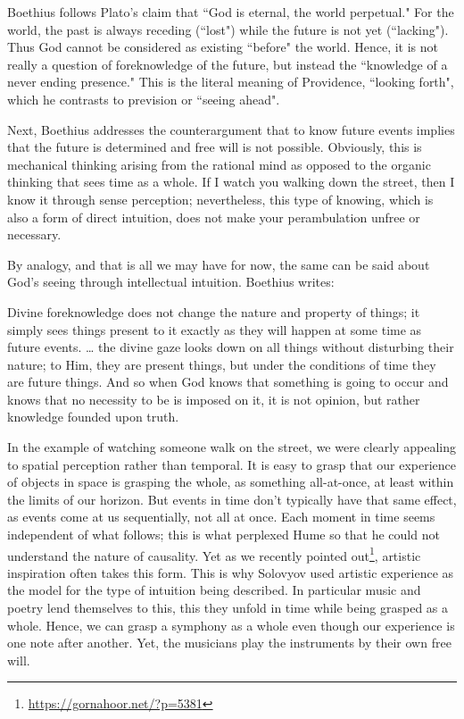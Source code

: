 Boethius follows Plato's claim that ``God is eternal, the world perpetual." For the world, the past is always receding (``lost") while the future is not yet (``lacking"). Thus God cannot be considered as existing ``before" the world. Hence, it is not really a question of foreknowledge of the future, but instead the ``knowledge of a never ending presence." This is the literal meaning of Providence, ``looking forth", which he contrasts to prevision or ``seeing ahead".

Next, Boethius addresses the counterargument that to know future events implies that the future is determined and free will is not possible. Obviously, this is mechanical thinking arising from the rational mind as opposed to the organic thinking that sees time as a whole. If I watch you walking down the street, then I know it through sense perception; nevertheless, this type of knowing, which is also a form of direct intuition, does not make your perambulation unfree or necessary.

By analogy, and that is all we may have for now, the same can be said about God's seeing through intellectual intuition. Boethius writes:

\begin{quotex}
Divine foreknowledge does not change the nature and property of things; it simply sees things present to it exactly as they will happen at some time as future events. … the divine gaze looks down on all things without disturbing their nature; to Him, they are present things, but under the conditions of time they are future things. And so when God knows that something is going to occur and knows that no necessity to be is imposed on it, it is not opinion, but rather knowledge founded upon truth. 

\end{quotex}
In the example of watching someone walk on the street, we were clearly appealing to spatial perception rather than temporal. It is easy to grasp that our experience of objects in space is grasping the whole, as something all-at-once, at least within the limits of our horizon. But events in time don't typically have that same effect, as events come at us sequentially, not all at once. Each moment in time seems independent of what follows; this is what perplexed Hume so that he could not understand the nature of causality. Yet as we recently pointed out\footnote{\url{https://gornahoor.net/?p=5381}}, artistic inspiration often takes this form. This is why Solovyov used artistic experience as the model for the type of intuition being described. In particular music and poetry lend themselves to this, this they unfold in time while being grasped as a whole. Hence, we can grasp a symphony as a whole even though our experience is one note after another. Yet, the musicians play the instruments by their own free will.

